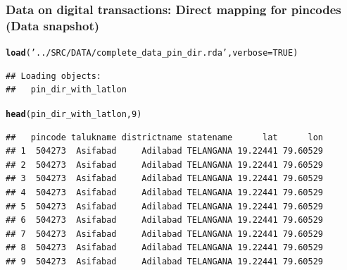 \documentclass{beamer}\usepackage[]{graphicx}\usepackage[]{color}
\makeatletter
\newcommand{\hlnum}[1]{\textcolor[rgb]{0.686,0.059,0.569}{#1}}%
\newcommand{\hlstr}[1]{\textcolor[rgb]{0.192,0.494,0.8}{#1}}%
\newcommand{\hlstd}[1]{\textcolor[rgb]{0.345,0.345,0.345}{#1}}%
\newcommand{\hlkwc}[1]{\textcolor[rgb]{0.333,0.667,0.333}{#1}}%
\newcommand{\hlkwd}[1]{\textcolor[rgb]{0.737,0.353,0.396}{\textbf{#1}}}%
\newenvironment{kframe}{%
 \def\at@end@of@kframe{}%
 \ifinner\ifhmode%
  \def\at@end@of@kframe{\end{minipage}}%
  \begin{minipage}{\columnwidth}%
 \fi\fi%
 \def\FrameCommand##1{\hskip\@totalleftmargin \hskip-\fboxsep
 \colorbox{shadecolor}{##1}\hskip-\fboxsep
     \hskip-\linewidth \hskip-\@totalleftmargin \hskip\columnwidth}%
 \MakeFramed {\advance\hsize-\width
   \@totalleftmargin\z@ \linewidth\hsize
   \@setminipage}}%
 {\par\unskip\endMakeFramed%
 \at@end@of@kframe}
\newenvironment{knitrout}{}{} %
\makeatother
\begin{document}
\begin{frame}[fragile]
  \frametitle{Data on digital transactions: Direct mapping for pincodes (Data snapshot)}
  \begin{footnotesize}
\begin{knitrout}
\color{fgcolor}\begin{kframe}
\begin{alltt}
\hlkwd{load}\hlstd{(}\hlstr{'../SRC/DATA/complete_data_pin_dir.rda'}\hlstd{,} \hlkwc{verbose} \hlstd{=} \hlnum{TRUE}\hlstd{)}
\end{alltt}
\begin{verbatim}
## Loading objects:
##   pin_dir_with_latlon
\end{verbatim}
\begin{alltt}
\hlkwd{head}\hlstd{(pin_dir_with_latlon,} \hlnum{9}\hlstd{)}
\end{alltt}
\begin{verbatim}
##   pincode talukname districtname statename      lat      lon
## 1  504273  Asifabad     Adilabad TELANGANA 19.22441 79.60529
## 2  504273  Asifabad     Adilabad TELANGANA 19.22441 79.60529
## 3  504273  Asifabad     Adilabad TELANGANA 19.22441 79.60529
## 4  504273  Asifabad     Adilabad TELANGANA 19.22441 79.60529
## 5  504273  Asifabad     Adilabad TELANGANA 19.22441 79.60529
## 6  504273  Asifabad     Adilabad TELANGANA 19.22441 79.60529
## 7  504273  Asifabad     Adilabad TELANGANA 19.22441 79.60529
## 8  504273  Asifabad     Adilabad TELANGANA 19.22441 79.60529
## 9  504273  Asifabad     Adilabad TELANGANA 19.22441 79.60529
\end{verbatim}
\end{kframe}
\end{knitrout}
  \end{footnotesize}
\end{frame}
\end{document}
